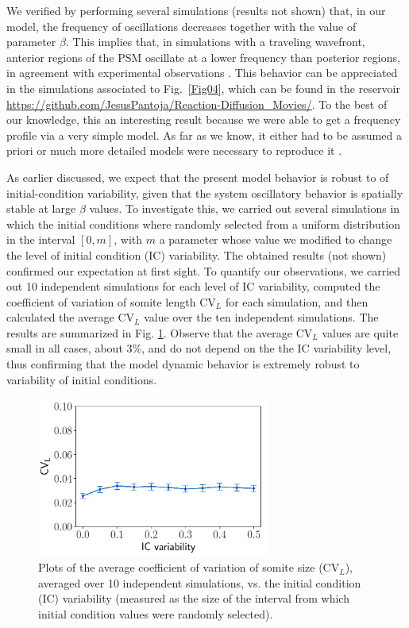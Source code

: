\documentclass[%
 preprint,
 aip, 
 amsmath,amssymb,
]{revtex4-2}
\begin{document}
We verified by performing several simulations (results not shown) that, in our model, the frequency of oscillations decreases together with the value of parameter $\beta$. This implies that, in simulations  with a traveling wavefront, anterior regions of the PSM oscillate at a lower frequency than posterior regions, in agreement with experimental observations \cite{Goldbeter2008, Hester2011}. This behavior can be appreciated in the simulations associated to Fig.~\ref{Fig04}, which can be found in the reservoir \url{https://github.com/JesusPantoja/Reaction-Diffusion_Movies/}. To the best of our knowledge, this an interesting result because we were able to get a frequency profile via a very simple model. As far as we know, it either had to be assumed a priori \cite{Morelli2009} or much more detailed models were necessary to reproduce it \cite{Hester2011}.
	
As earlier discussed, we expect that the present model behavior is robust to  of initial-condition variability, given that the system  oscillatory behavior is spatially stable at large $\beta$ values. To investigate this, we carried out several simulations in which the initial conditions where randomly selected from a uniform distribution in the interval $[0, m]$, with $m$ a parameter whose value we modified to change the level of initial condition (IC)  variability. The obtained results (not shown) confirmed our expectation at first sight. To quantify our observations, we carried out 10 independent simulations for each level of IC variability, computed the coefficient of variation of somite length $\text{CV}_L$ for each simulation, and then calculated the average $\text{CV}_L$ value over the ten independent simulations. The results are summarized in Fig. \ref{Fig06_1}. Observe that the average $\text{CV}_L$ values are quite small in all cases, about 3\%, and do not depend on the the IC variability level, thus confirming that the model dynamic behavior is extremely robust to variability of initial conditions. 

\begin{figure}
	\centering
	\includegraphics[width=3in]{Fig06}
	\caption{Plots of the average coefficient of variation of somite size ($\text{CV}_L$), averaged over 10 independent simulations, vs. the initial condition (IC) variability (measured as the size of the interval from which initial condition values were randomly selected).}
	\label{Fig06_1}
\end{figure}
\end{document}

